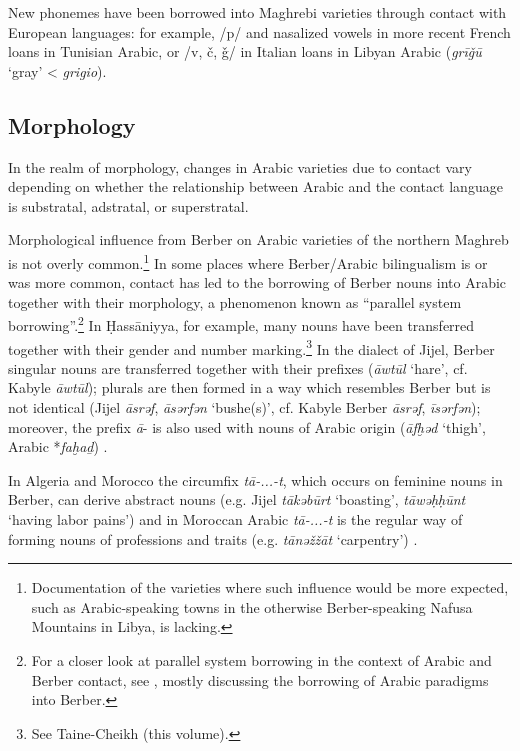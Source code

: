 \documentclass[output=paper]{langsci/langscibook}
\begin{document}
  New phonemes have been borrowed into Maghrebi varieties through contact with European languages: for example, /p/ and nasalized vowels in more recent French loans in Tunisian Arabic, or /v, č, ǧ/ in Italian loans in Libyan Arabic (\textit{grīǧū} ‘gray’ < \textit{grigio}).

  \subsection{Morphology}\label{Morphology}

In the realm of morphology, changes in Arabic varieties due to contact vary depending on whether the relationship between Arabic and the contact language is substratal, adstratal, or superstratal.

  Morphological influence from Berber on Arabic varieties of the northern Maghreb is not overly common.\footnote{Documentation of the varieties where such influence would be more expected, such as Arabic-speaking towns in the otherwise Berber-speaking Nafusa Mountains in Libya, is lacking.} In some places where Berber/Arabic bilingualism is or was more common, contact has led to the borrowing of Berber nouns into Arabic together with their morphology, a phenomenon known as “parallel system borrowing”.\footnote{For a closer look at parallel system borrowing in the context of Arabic and Berber contact, see \citet{Kossmann2010}, mostly discussing the borrowing of Arabic paradigms into Berber.} In Ḥassāniyya, for example, many nouns have been transferred together with their gender and number marking.\footnote{See Taine-Cheikh (this volume).} In the dialect of Jijel, Berber singular nouns are transferred together with their prefixes (\textit{āwtūl} ‘hare’, cf. Kabyle \textit{āwtūl}); plurals are then formed in a way which resembles Berber but is not identical (Jijel \textit{āsrǝf}, \textit{āsǝrfǝn} ‘bushe(s)’, cf. Kabyle Berber \textit{āsrǝf}, \textit{īsǝrfǝn}); moreover, the prefix \textit{ā}{}- is also used with nouns of Arabic origin (\textit{āfḫǝd} ‘thigh’, Arabic *\textit{faḫaḏ}) \citep[302–318]{Marçais1956}.

  In Algeria and Morocco the circumfix \textit{tā-...-t}, which occurs on feminine nouns in Berber, can derive abstract nouns (e.g. Jijel \textit{tākǝbūrt} ‘boasting’, \textit{tāwǝḥḥūnt} ‘having labor pains’) and in Moroccan Arabic \textit{tā-...-t} is the regular way of forming nouns of professions and traits (e.g. \textit{tānǝžžā{\R}t} ‘carpentry’) \citep{Kossmann2013chapter}.
\end{document}
